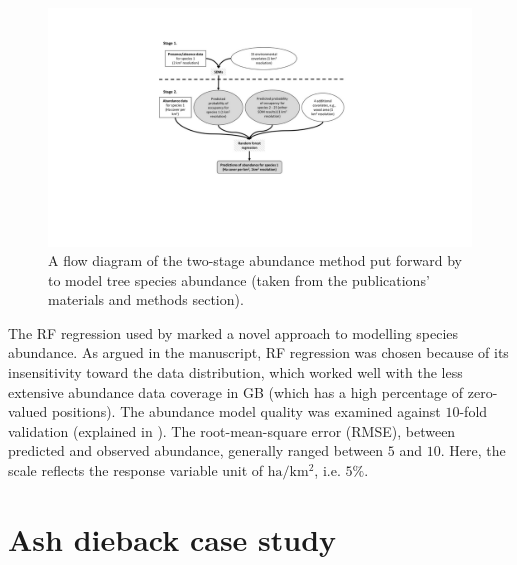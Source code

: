 \begin{figure}
    \centering
    \includegraphics[scale=0.55]{chapter2/figures/hill-method-fig.pdf}
    \caption{A flow diagram of the two-stage abundance method put forward by \cite{hill.data} to model tree species abundance  
    (taken from the publications' materials and methods section).}
    \label{fig:hill-method}
\end{figure}

The RF regression used by \cite{hill.data} marked a novel approach to modelling species abundance.
As argued in the manuscript, RF regression was chosen because of its insensitivity toward the data distribution, which
worked well with the less extensive abundance data coverage in GB (which has a high percentage of zero-valued positions).
The abundance model quality was examined against $10$-fold validation (explained in \cite{refaeilzadeh2009cross}).
The root-mean-square error (RMSE), between predicted and observed abundance, generally ranged between $5$ and $10$.
Here, the scale reflects the response variable unit of $\mathrm{ha/km^2}$, i.e. $5\%$.








\newpage
\section{Ash dieback case study}


